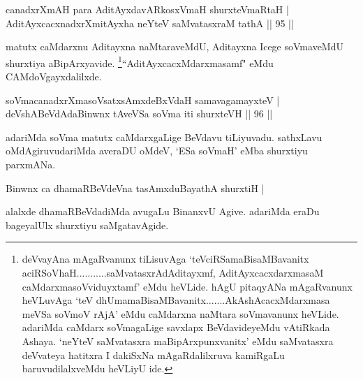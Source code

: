 \begin{shl}
canadxrXmAH para AditAyxdavARkosxVmaH shurxteVmaRtaH | \\
AditAyxcacxnadxrXmitAyxha neYteV saMvatasxraM tathA \hfill|| 95 || 
\end{shl}

\begin{artha}
matutx caMdarxnu Aditayxna naMtaraveMdU, Aditayxna Icege soVmaveMdU shurxtiya aBipArxyavide. \footnote[1]{deVvayAna mAgaRvanunx tiLisuvAga `teVciRSamaBi\-saMBavanitx aciRSoV\s haH...........saMvatasxrAdAditayxmf, AditAyxcacxdarxmasaM caMdarxmasoVviduyxtamf' eMdu heVLide. hAgU pitaqyANa mAgaRvanunx heVLuvAga `teV dhUmamaBi\-saMBavanitx.......AkAshAcacxMdarxmasa meVSa soVmoV rAjA' eMdu caMdarxna naMtara soVma\-vanunx heVLide. adariMda caMdarx soVmagaLige savxlapx BeVdavideyeMdu vAtiRkada Ashaya. `neYteV \-saMvatasxra maBipArxpunxvanitx' eMdu saMvatasxra deVvateya hatitxra I dakiSxNa mAgaRdalilxruva kamiRgaLu baruvudilalxveMdu heVLiyU ide.}``AditAyxcacxMdarxmasamf" eMdu CAMdoVgayxdalilxde.
\end{artha}


\begin{shl}
soVmacanadxrXmasoVsatxsAmxdeBxVdaH samavagamayxteV | \\
\footnotemark[1]deVshABeVdAdaBinwnx tAveVSa soVma iti shurxteVH \hfill|| 96 || 
\end{shl}

\begin{artha}
adariMda soVma matutx caMdarxgaLige BeVdavu tiLiyuvadu. sathxLavu 
oMdAgiruvudariMda averaDU oMdeV, `ESa soVmaH' eMba shurxtiyu parxmANa.
\end{artha}


\begin{shl}
Binwnx ca \footnotemark[2]dhamaRBeVdeVna tasAmxduBayathA shurxtiH | \\
\end{shl}

\begin{artha}
alalxde dhamaRBeVdadiMda avugaLu BinanxvU Agive. adariMda eraDu bageyalUlx shurxtiyu saMgatavAgide. 
\end{artha}

